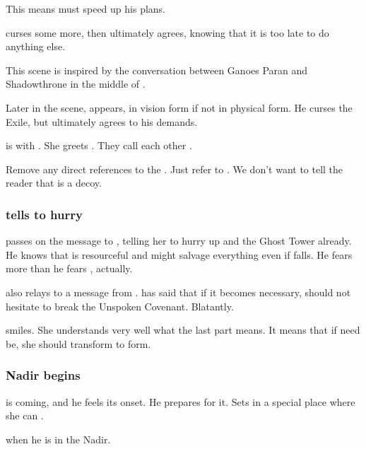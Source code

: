This means \Psyrex{} must speed up his plans. 

\Psyrex{} curses some more, then ultimately agrees, knowing that it is too late to do anything else. 

This scene is inspired by the conversation between Ganoes Paran and Shadowthrone in the middle of \cite{StevenErikson:TheBonehunters}. 

Later in the scene, \Secherdamon appears, in vision form if not in physical form. 
He curses the Exile, but ultimately agrees to his demands. 

\Criseis is with \Ishnaruchaefir. 
She greets \Psyrex. 
They call each other . 

Remove any direct references to the \Malcur \nexus. 
Just refer to . 
We don't want to tell the reader that \Forclin{} is a decoy. 





\subsubsection{\Psyrex tells \Nzessuacrith to hurry}
\Psyrex passes on the message to \Nzessuacrith, telling her to hurry up and  the Ghost Tower already. 
He knows that \Achsah{} is resourceful and might salvage everything even if \Teshrial{} falls.
He fears \Achsah more than he fears \Teshrial, actually. 

\Psyrex also relays to \Nzessuacrith a message from \Secherdamon.
\Secherdamon has said that if it becomes necessary, \Nzessuacrith should not hesitate to break the Unspoken Covenant.
Blatantly.

\Nzessuacrith smiles. 
She understands very well what the last part means.
It means that if need be, she should transform to \draconian form. 





\subsubsection{Nadir begins}
 is coming, and he feels its onset. 
He prepares for it. 
Sets \Rystessakhin{} in a special place where she can . 

\Ishnaruchaefir {} when he is in the Nadir. 

